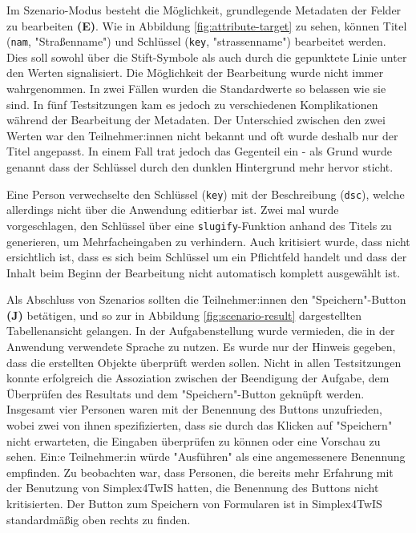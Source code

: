 \pskip
Im Szenario-Modus besteht die Möglichkeit, grundlegende Metadaten der Felder zu bearbeiten \textbf{(E)}. Wie in Abbildung \ref{fig:attribute-target} zu sehen, können Titel (\texttt{nam}, "Straßenname") und Schlüssel (\texttt{key}, "strassenname") bearbeitet werden. Dies soll sowohl über die Stift-Symbole als auch durch die gepunktete Linie unter den Werten signalisiert. Die Möglichkeit der Bearbeitung wurde nicht immer wahrgenommen. In zwei Fällen wurden die Standardwerte so belassen wie sie sind. In fünf Testsitzungen kam es jedoch zu verschiedenen Komplikationen während der Bearbeitung der Metadaten. Der Unterschied zwischen den zwei Werten war den Teilnehmer:innen nicht bekannt und oft wurde deshalb nur der Titel angepasst. In einem Fall trat jedoch das Gegenteil ein - als Grund wurde genannt dass der Schlüssel durch den dunklen Hintergrund mehr hervor sticht.

Eine Person verwechselte den Schlüssel (\texttt{key}) mit der Beschreibung (\texttt{dsc}), welche allerdings nicht über die Anwendung editierbar ist. Zwei mal wurde vorgeschlagen, den Schlüssel über eine \texttt{slugify}-Funktion anhand des Titels zu generieren, um Mehrfacheingaben zu verhindern. Auch kritisiert wurde, dass nicht ersichtlich ist, dass es sich beim Schlüssel um ein Pflichtfeld handelt und dass der Inhalt beim Beginn der Bearbeitung nicht automatisch komplett ausgewählt ist.

\pskip
Als Abschluss von Szenarios sollten die Teilnehmer:innen den "Speichern"-Button \textbf{(J)} betätigen, und so zur in Abbildung \ref{fig:scenario-result} dargestellten Tabellenansicht gelangen. In der Aufgabenstellung wurde vermieden, die in der Anwendung verwendete Sprache zu nutzen. Es wurde nur der Hinweis gegeben, dass die erstellten Objekte überprüft werden sollen. Nicht in allen Testsitzungen konnte erfolgreich die Assoziation zwischen der Beendigung der Aufgabe, dem Überprüfen des Resultats und dem "Speichern"-Button geknüpft werden. Insgesamt vier Personen waren mit der Benennung des Buttons unzufrieden, wobei zwei von ihnen spezifizierten, dass sie durch das Klicken auf "Speichern" nicht erwarteten, die Eingaben überprüfen zu können oder eine Vorschau zu sehen. Ein:e Teilnehmer:in würde "Ausführen" als eine angemessenere Benennung empfinden. Zu beobachten war, dass Personen, die bereits mehr Erfahrung mit der Benutzung von Simplex4TwIS hatten, die Benennung des Buttons nicht kritisierten. Der Button zum Speichern von Formularen ist in Simplex4TwIS standardmäßig oben rechts zu finden.

